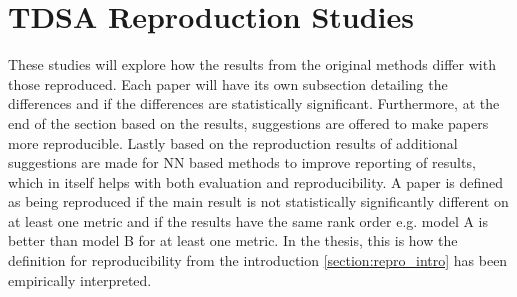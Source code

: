 \FloatBarrier
\section{TDSA Reproduction Studies}
\label{section:repro_replication}

These studies will explore how the results from the original methods differ with those reproduced. Each paper will have its own subsection detailing the differences and if the differences are statistically significant. Furthermore, at the end of the section based on the results, suggestions are offered to make papers more reproducible. Lastly based on the reproduction results of \citet{tang-etal-2016-effective} additional suggestions are made for NN based methods to improve reporting of results, which in itself helps with both evaluation and reproducibility. A paper is defined as being reproduced if the main result is not statistically significantly different on at least one metric and if the results have the same rank order e.g. model A is better than model B for at least one metric. In the thesis, this is how the definition for reproducibility from the introduction \ref{section:repro_intro} has been empirically interpreted. 

\FloatBarrier
